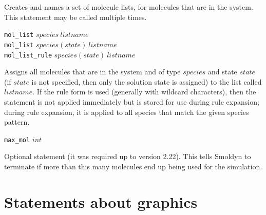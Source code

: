 \documentclass {book}
\newcommand {\ttt} {\texttt}
\begin{document}
\begin{description}
Creates and names a set of molecule lists, for molecules that are in the system. This statement may be called multiple times.

\item{\ttt{mol\_list} $species\ listname$\\
\ttt{mol\_list} $species(state)\ listname$\\
\ttt{mol\_list\_rule} $species(state)\ listname$}

Assigns all molecules that are in the system and of type $species$ and state $state$ (if $state$ is not specified, then only the solution state is assigned) to the list called $listname$. If the rule form is used (generally with wildcard characters), then the statement is not applied immediately but is stored for use during rule expansion; during rule expansion, it is applied to all species that match the given species pattern.

\item{\ttt{max\_mol} $int$}

Optional statement (it was required up to version 2.22). This tells Smoldyn to terminate if more than this many molecules end up being used for the simulation.

\end{description}

\section{Statements about graphics}
\end{document}
